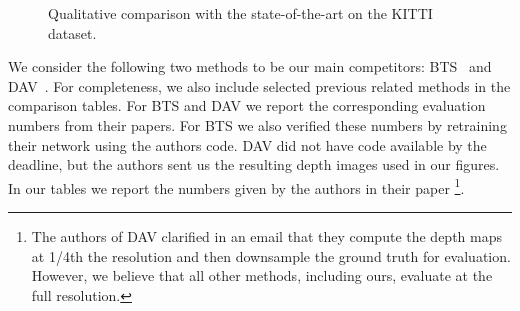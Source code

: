 \documentclass[final]{cvpr}
\begin{document}
\begin{figure}
     \centering
     \hspace{0.3em}%
     \hspace{0.3em}%
     \hspace{0.3em}%
        \caption{Qualitative comparison with the state-of-the-art on the KITTI dataset.}
        \label{fig:qualitative-comparison-kitti}
\end{figure}

We consider the following two methods to be our main competitors: BTS~\cite{bts_lee2019big} and DAV~\cite{dav_huynh2020guiding}.  
For completeness, we also include selected previous related methods in the comparison tables.
For BTS and DAV we report the corresponding evaluation numbers from their papers. For BTS we also verified these numbers by retraining their network using the authors code. DAV did not have code available by the deadline, but the authors sent us the resulting depth images used in our figures. In our tables we report the numbers given by the authors in their paper \footnote{The authors of DAV clarified in an email that they compute the depth maps at 1/4th the resolution and then downsample the ground truth for evaluation. However, we believe that all other methods, including ours, evaluate at the full resolution.}.
\end{document}
